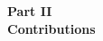 
\vspace*{\fill}
\begin{center}
   \Huge{\textbf{Part II}} \\
   \Huge{\textbf{Contributions}}
\end{center}
\vspace*{\fill}

\newpage